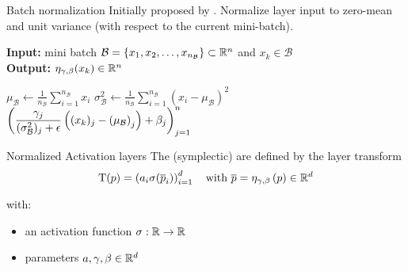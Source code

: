 \begin{frame}[c]{Batch normalization}
  Initially proposed by .
   Normalize layer input 
  to zero-mean and unit variance (with respect to the current mini-batch).

  \begin{algorithm}[H]
    \caption{Batch normalization transform $\eta_{\gamma, \beta}$}
    \textbf{Input:} mini batch $\mathcal{B} = \{x_1, x_2, \dots, x_{n_\mathcal{B}}\} \subset \mathbb{R}^n$ 
    and $x_k \in \mathcal{B}$ \\
    \textbf{Output:} $\eta_{\gamma, \beta}(x_k) \in \mathbb{R}^n$
    \begin{algorithmic}
       
        \State $\displaystyle
        \mu_\mathcal{B} \gets \frac{1}{n_\mathcal{B}} \sum_{i=1}^{n_\mathcal{B}} x_i$
        \State $\displaystyle
        \sigma^2_\mathcal{B} \gets \frac{1}{n_\mathcal{B}} \sum_{i=1}^{n_\mathcal{B}} 
        (x_i - \mu_\mathcal{B})^2$
      \EndIf
      \State \Return 
      $\displaystyle \left( \frac{\gamma_j}{(\sigma^2_\mathcal{B})_j + \epsilon} 
      \left( (x_k)_j - \left( \mu_\mathcal{B} \right)_j \right) + \beta_j \right)_{j=1}^n$
    \end{algorithmic}
  \end{algorithm}
\end{frame}

\begin{frame}[c]{Normalized Activation layers}
  The (symplectic)  are defined by the layer transform
  \begin{equation*}
		\mathrm{T}(p) = \left( a_i \sigma(\overline{p}_i) \right)_{i=1}^d
		\quad \text{with } \overline{p} = \eta_{\gamma, \beta} \left( p \right) \in \mathbb{R}^d
	\end{equation*}

  with:
  \begin{itemize}
    \item an activation function $\sigma : \mathbb{R} \to \mathbb{R}$
    \item parameters $a,\gamma, \beta \in \mathbb{R}^d$ 
  \end{itemize}
\end{frame}

